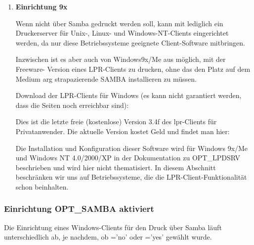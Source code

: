 \begin{enumerate}
\item \textbf{Einrichtung 9x}

    Wenn nicht über Samba gedruckt werden soll, kann mit 
    lediglich ein Druckerserver für Unix-, Linux- und Windows-NT-Clients
    eingerichtet werden, da nur diese Betriebssysteme geeignete Client-Software
    mitbringen.

    Inzwischen ist es aber auch von Windows9x/Me aus möglich, mit der Freeware-
    Version eines LPR-Clients zu drucken, ohne das den Platz auf dem Medium arg
    strapazierende SAMBA installieren zu müssen.

    Download der LPR-Clients für Windows (es kann nicht garantiert werden, dass
    die Seiten noch erreichbar sind):\\

    Dies ist die letzte freie (kostenlose) Version 3.4f des lpr-Clients für
    Privatanwender. Die aktuelle Version kostet Geld und findet man hier:


    Die Installation und Konfiguration dieser Software wird für Windows 9x/Me
    und Windows NT 4.0/2000/XP in der Dokumentation zu OPT\_LPDSRV beschrieben
    und wird hier nicht thematisiert.
    In diesem Abschnitt beschränken wir uns auf Betriebssysteme, die die
    LPR-Client-Funktionalität schon beinhalten.



\end{enumerate}
\subsubsection{Einrichtung OPT\_SAMBA aktiviert}

    Die Einrichtung eines Windows-Clients für den Druck über Samba läuft
    unterschiedlich ab, je nachdem, ob ='no'
    oder ='yes' gewählt wurde.

